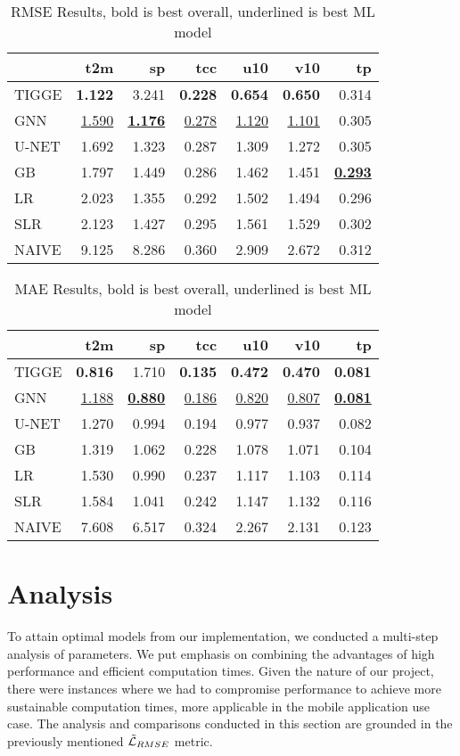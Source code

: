 \begin{table}
\centering
\caption{RMSE Results, bold is best overall, underlined is best ML model}
\label{tab:rmse}
\begin{tabular}{lrrrrrr}
\toprule
 & t2m & sp & tcc & u10 & v10 & tp \\
\midrule
TIGGE & \textbf{1.122} & 3.241 & \textbf{0.228} & \textbf{0.654} & \textbf{0.650} & 0.314 \\
GNN & \underline{1.590} & \underline{\textbf{1.176}} & \underline{0.278} & \underline{1.120} & \underline{1.101} & 0.305 \\
U-NET & 1.692 & 1.323 & 0.287 & 1.309 & 1.272 & 0.305 \\
GB & 1.797 & 1.449 & 0.286 & 1.462 & 1.451 & \underline{\textbf{0.293}} \\
LR & 2.023 & 1.355 & 0.292 & 1.502 & 1.494 & 0.296 \\
SLR & 2.123 & 1.427 & 0.295 & 1.561 & 1.529 & 0.302 \\
NAIVE & 9.125 & 8.286 & 0.360 & 2.909 & 2.672 & 0.312 \\
\bottomrule
\end{tabular}
\end{table}

\begin{table}
\centering
\caption{MAE Results, bold is best overall, underlined is best ML model}
\label{tab:mae}
\begin{tabular}{lrrrrrr}
\toprule
 & t2m & sp & tcc & u10 & v10 & tp \\
\midrule
TIGGE & \textbf{0.816} & 1.710 & \textbf{0.135} & \textbf{0.472} & \textbf{0.470} & \textbf{0.081} \\
GNN & \underline{1.188} & \underline{\textbf{0.880}} & \underline{0.186} & \underline{0.820} & \underline{0.807} & \underline{\textbf{0.081}} \\
U-NET & 1.270 & 0.994 & 0.194 & 0.977 & 0.937 & 0.082 \\
GB & 1.319 & 1.062 & 0.228 & 1.078 & 1.071 & 0.104 \\
LR & 1.530 & 0.990 & 0.237 & 1.117 & 1.103 & 0.114 \\
SLR & 1.584 & 1.041 & 0.242 & 1.147 & 1.132 & 0.116 \\
NAIVE & 7.608 & 6.517 & 0.324 & 2.267 & 2.131 & 0.123 \\
\bottomrule
\end{tabular}
\end{table}



\section{Analysis}\label{chap:analysis}
To attain optimal models from our implementation, we conducted a multi-step analysis of parameters. We put emphasis on combining the advantages of high performance and efficient computation times. Given the nature of our project, there were instances where we had to compromise performance to achieve more sustainable computation times, more applicable in the mobile application use case. The analysis and comparisons conducted in this section are grounded in the previously mentioned $\Tilde{\mathcal{L}}_{RMSE}$ metric.

